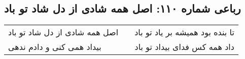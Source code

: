 \begin{center}
\section*{رباعی شماره ۱۱۰: اصل همه شادی از دل شاد تو باد}
\label{sec:sh110}
\begin{longtable}{l p{0.5cm} r}
اصل همه شادی از دل شاد تو باد
&&
تا بنده بود همیشه بر یاد تو باد
\\
بیداد همی کنی و دادم ندهی
&&
داد همه کس فدای بیداد تو باد
\\
\end{longtable}
\end{center}
